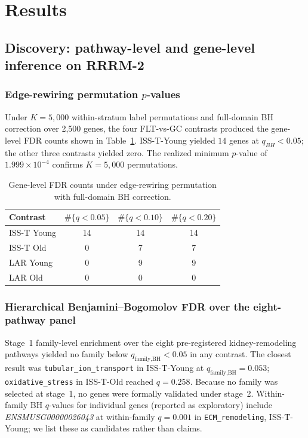 \documentclass[11pt]{article}
\newcommand{\code}[1]{\texttt{#1}}
\newcommand{\gene}[1]{\textit{#1}}
\begin{document}
\section{Results}

\subsection{Discovery: pathway-level and gene-level inference on RRRM-2}

\subsubsection{Edge-rewiring permutation $p$-values}

Under $K{=}5{,}000$ within-stratum label permutations and full-domain BH correction over 2{,}500 genes, the four FLT-vs-GC contrasts produced the gene-level FDR counts shown in Table~\ref{tab:fdr_counts}. ISS-T-Young yielded $14$ genes at $q_{BH} < 0.05$; the other three contrasts yielded zero. The realized minimum $p$-value of $1.999\times 10^{-4}$ confirms $K{=}5{,}000$ permutations.

\begin{table}[h]
\centering\small
\begin{tabular}{lccc}
\toprule
Contrast & $\#\{q < 0.05\}$ & $\#\{q < 0.10\}$ & $\#\{q < 0.20\}$ \\
\midrule
ISS-T Young & 14 & 14 & 14 \\
ISS-T Old & 0 & 7 & 7 \\
LAR Young & 0 & 9 & 9 \\
LAR Old & 0 & 0 & 0 \\
\bottomrule
\end{tabular}
\caption{Gene-level FDR counts under edge-rewiring permutation with full-domain BH correction.}
\label{tab:fdr_counts}
\end{table}

\subsubsection{Hierarchical Benjamini--Bogomolov FDR over the eight-pathway panel}

Stage~1 family-level enrichment over the eight pre-registered kidney-remodeling pathways yielded no family below $q_{\text{family,BH}} < 0.05$ in any contrast. The closest result was \code{tubular\_ion\_transport} in ISS-T-Young at $q_{\text{family,BH}} = 0.053$; \code{oxidative\_stress} in ISS-T-Old reached $q = 0.258$. Because no family was selected at stage~1, no genes were formally validated under stage~2. Within-family BH $q$-values for individual genes (reported as exploratory) include \gene{ENSMUSG00000026043} at within-family $q = 0.001$ in \code{ECM\_remodeling}, ISS-T-Young; we list these as candidates rather than claims.
\end{document}
